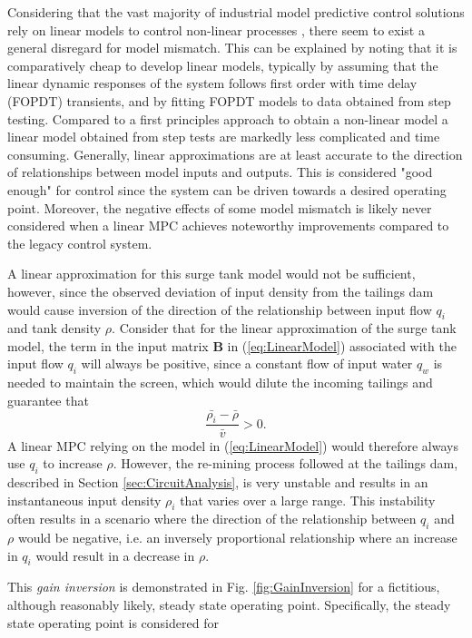 \documentclass[preprint,authoryear,12pt]{elsarticle}
\begin{document}
Considering that the vast majority of industrial model predictive control solutions rely on linear models to control non-linear processes \citep{QinAndBadgwell2003}, there seem to exist a general disregard for model mismatch. This can be explained by noting that it is comparatively cheap to develop linear models, typically by assuming that the linear dynamic responses of the system follows first order with time delay (FOPDT) transients, and by fitting FOPDT models to data obtained from step testing. Compared to a first principles approach to obtain a non-linear model a linear model obtained from step tests are markedly less complicated and time consuming. Generally, linear approximations are at least accurate to the direction of relationships between model inputs and outputs. This is considered "good enough" for control since the system can be driven towards a desired operating point. Moreover, the negative effects of some model mismatch is likely never considered when a linear MPC achieves noteworthy improvements compared to the legacy control system. 

A linear approximation for this surge tank model would not be sufficient, however, since the observed deviation of input density from the tailings dam would cause inversion of the direction of the relationship between input flow $q_i$ and tank density $\rho$. Consider that for the linear approximation of the surge tank model, the term in the input matrix $\boldsymbol{B}$ in (\ref{eq:LinearModel}) associated with the input flow $q_i$ will always be positive, since a constant flow of input water $q_w$ is needed to maintain the screen, which would dilute the incoming tailings and guarantee that 
\begin{equation}
	\frac{\bar{\rho_i} - \bar{\rho}}{\bar{v}} > 0 .
\end{equation}
A linear MPC relying on the model in (\ref{eq:LinearModel}) would therefore always use $q_i$ to increase $\rho$. However, the re-mining process followed at the tailings dam, described in Section \ref{sec:CircuitAnalysis}, is very unstable and results in an instantaneous input density $\rho_i$ that varies over a large range. This instability often results in a scenario where the direction of the relationship between $q_i$ and $\rho$ would be negative, i.e. an inversely proportional relationship where an increase in $q_i$ would result in a decrease in $\rho$. 

This \emph{gain inversion} is demonstrated in Fig. \ref{fig:GainInversion} for a fictitious, although reasonably likely, steady state operating point. Specifically, the steady state operating point is considered for 
\end{document}
